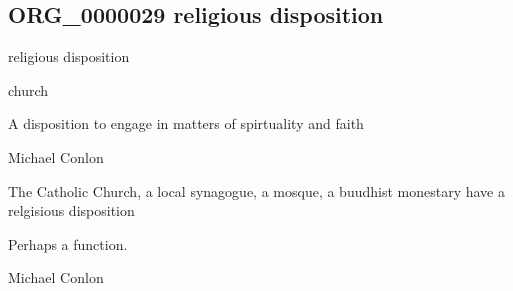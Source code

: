 \documentclass[letterpaper,10pt,english]{sphinxmanual}
\begin{document}
\subsection{ORG\_0000029 \sphinxhyphen{} religious disposition}
\label{\detokenize{doc-ORG_0000029:org-0000029-religious-disposition}}\label{\detokenize{doc-ORG_0000029:index-0}}\label{\detokenize{doc-ORG_0000029::doc}}
\begin{sphinxShadowBox}

\sphinxAtStartPar
religious disposition
\end{sphinxShadowBox}

\begin{sphinxShadowBox}

\sphinxAtStartPar
church
\end{sphinxShadowBox}

\begin{sphinxShadowBox}

\sphinxAtStartPar
A disposition to engage in matters of spirtuality and faith
\end{sphinxShadowBox}

\begin{sphinxShadowBox}

\sphinxAtStartPar
Michael Conlon 
\end{sphinxShadowBox}

\begin{sphinxShadowBox}

\sphinxAtStartPar
The Catholic Church, a local synagogue, a mosque, a buudhist monestary have a relgisious disposition
\end{sphinxShadowBox}

\begin{sphinxShadowBox}

\sphinxAtStartPar
Perhaps a function.
\end{sphinxShadowBox}

\begin{sphinxShadowBox}

\sphinxAtStartPar
Michael Conlon 
\end{sphinxShadowBox}
\begin{quote}

\ignorespaces \end{quote}
\end{document}

